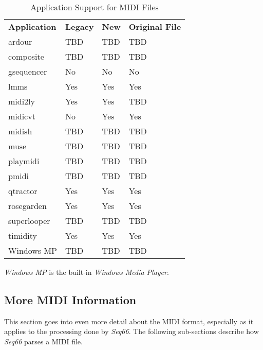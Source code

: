    \begin{table}
      \centering
      \caption{Application Support for MIDI Files}
      \label{table:midi_file_support_table}
      \begin{tabular}{l l l l}
         \textbf{Application}  &
            \textbf{Legacy} &
            \textbf{New} & 
            \textbf{Original File} \\
         ardour       & TBD       & TBD       & TBD \\
         composite    & TBD       & TBD       & TBD \\
         gsequencer   & No        & No        & No \\
         lmms         & Yes       & Yes       & Yes \\
         midi2ly      & Yes       & Yes       & TBD \\
         midicvt      & No        & Yes       & Yes \\
         midish       & TBD       & TBD       & TBD \\
         muse         & TBD       & TBD       & TBD \\
         playmidi     & TBD       & TBD       & TBD \\
         pmidi        & TBD       & TBD       & TBD \\
         qtractor     & Yes       & Yes       & Yes \\
         rosegarden   & Yes       & Yes       & Yes \\
         superlooper  & TBD       & TBD       & TBD \\
         timidity     & Yes       & Yes       & Yes \\
         Windows MP   & TBD       & TBD       & TBD \\
      \end{tabular}
   \end{table}

   \textsl{Windows MP} is the built-in \textsl{Windows Media Player}.

\subsection{More MIDI Information}
\label{subsec:midi_information_more}

   This section goes into even more detail about the MIDI format, especially as
   it applies to the processing done by \textsl{Seq66}.
   The following sub-sections describe how \textsl{Seq66}
   parses a MIDI file.

